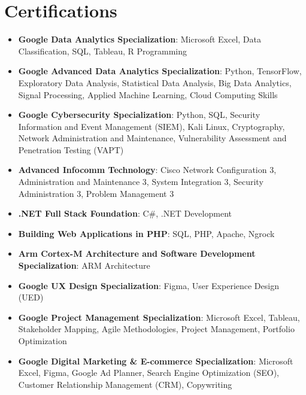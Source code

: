 \documentclass[letterpaper,11pt]{article}
\newcommand{\resumeItem}[2]{
  \item\small{
    \textbf{#1}{: #2 \vspace{-2pt}}
  }
}
\newcommand{\resumeSubItem}[2]{\resumeItem{#1}{#2}\vspace{-4pt}}
\newcommand{\resumeSubHeadingListStart}{\begin{itemize}[leftmargin=*]}
\newcommand{\resumeSubHeadingListEnd}{\end{itemize}}
\begin{document}
\section{Certifications}
 \resumeSubHeadingListStart
    \resumeSubItem{Google Data Analytics Specialization}
        {Microsoft Excel, Data Classification, SQL, Tableau, R Programming}
    \resumeSubItem{Google Advanced Data Analytics Specialization}
        {Python, TensorFlow, Exploratory Data Analysis, Statistical Data Analysis, Big Data Analytics, Signal Processing, Applied Machine Learning, Cloud Computing Skills}
    \resumeSubItem{Google Cybersecurity Specialization}
        {Python, SQL, Security Information and Event Management (SIEM), Kali Linux, Cryptography, Network Administration and Maintenance, Vulnerability Assessment and Penetration Testing (VAPT)} 
    \resumeSubItem{Advanced Infocomm Technology}
        {Cisco Network Configuration 3, Administration and Maintenance 3, System Integration 3, Security Administration 3, Problem Management 3}
    \resumeSubItem{.NET Full Stack Foundation}
        {C\#, .NET Development}
    \resumeSubItem{Building Web Applications in PHP}
        {SQL, PHP, Apache, Ngrock}
    \resumeSubItem{Arm Cortex-M Architecture and Software Development Specialization}
        {ARM Architecture}
    \resumeSubItem{Google UX Design Specialization}
        {Figma, User Experience Design (UED)}
    \resumeSubItem{Google Project Management Specialization}
        {Microsoft Excel, Tableau, Stakeholder Mapping, Agile Methodologies, Project Management, Portfolio Optimization}
    \resumeSubItem{Google Digital Marketing \& E-commerce Specialization}
        {Microsoft Excel, Figma, Google Ad Planner, Search Engine Optimization (SEO), Customer Relationship Management (CRM), Copywriting}      
 \resumeSubHeadingListEnd
 
\end{document}
